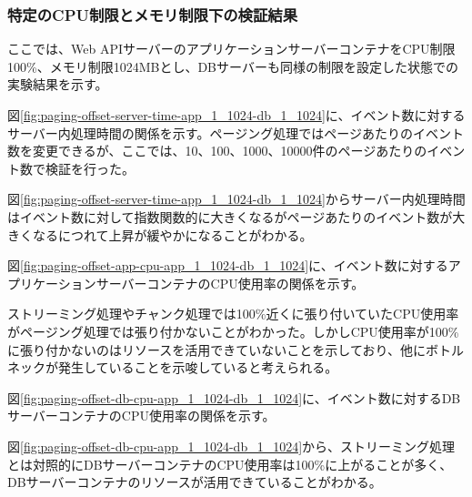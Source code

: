 \documentclass[../../../../main]{subfiles}
\begin{document}
    \subsubsection{特定のCPU制限とメモリ制限下の検証結果}\label{subsubsec:result-paging-offset-only-limit}

    ここでは、Web APIサーバーのアプリケーションサーバーコンテナをCPU制限100\%、メモリ制限1024MBとし、DBサーバーも同様の制限を設定した状態での実験結果を示す。

    \label{subsubsubsec:result-paging-offset-only-limit-server-time}

    図\ref{fig:paging-offset-server-time-app_1_1024-db_1_1024}に、イベント数に対するサーバー内処理時間の関係を示す。ページング処理ではページあたりのイベント数を変更できるが、ここでは、10、100、1000、10000件のページあたりのイベント数で検証を行った。

    

    図\ref{fig:paging-offset-server-time-app_1_1024-db_1_1024}からサーバー内処理時間はイベント数に対して指数関数的に大きくなるがページあたりのイベント数が大きくなるにつれて上昇が緩やかになることがわかる。

    \label{subsubsubsec:result-paging-offset-only-limit-cpu}

    図\ref{fig:paging-offset-app-cpu-app_1_1024-db_1_1024}に、イベント数に対するアプリケーションサーバーコンテナのCPU使用率の関係を示す。

    

    ストリーミング処理やチャンク処理では100\%近くに張り付いていたCPU使用率がページング処理では張り付かないことがわかった。しかしCPU使用率が100\%に張り付かないのはリソースを活用できていないことを示しており、他にボトルネックが発生していることを示唆していると考えられる。

    図\ref{fig:paging-offset-db-cpu-app_1_1024-db_1_1024}に、イベント数に対するDBサーバーコンテナのCPU使用率の関係を示す。

    

    図\ref{fig:paging-offset-db-cpu-app_1_1024-db_1_1024}から、ストリーミング処理とは対照的にDBサーバーコンテナのCPU使用率は100\%に上がることが多く、DBサーバーコンテナのリソースが活用できていることがわかる。

    \label{subsubsubsec:result-paging-offset-only-limit-mem}
\end{document}
